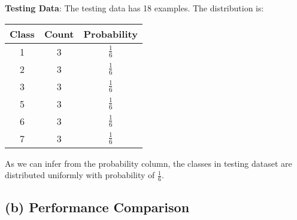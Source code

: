 \documentclass[letterpaper,doc,notimes]{apa6}
\begin{document}
\begin{description}
	\textbf{Testing Data}: \newline
	The testing data has 18 examples. The distribution is: \newline
	\begin{tabular}{| c | c | c| }
		\hline
		Class & Count & Probability \\
		\hline \hline
		1     &  3   &  $\frac{1}{6}$ \\ \hline
		2     &  3   &  $\frac{1}{6}$ \\ \hline
		3     &  3   &  $\frac{1}{6}$ \\ \hline
		5     &  3   &  $\frac{1}{6}$ \\ \hline
		6     &  3   &  $\frac{1}{6}$ \\ \hline
		7     &  3   &  $\frac{1}{6}$ \\ \hline
	\end{tabular} \newline
	As we can infer from the probability column, the classes in testing dataset are distributed uniformly with probability of $\frac{1}{6}$.
		
	
\end{description}
\subsection{(b) Performance Comparison}
\end{document}
